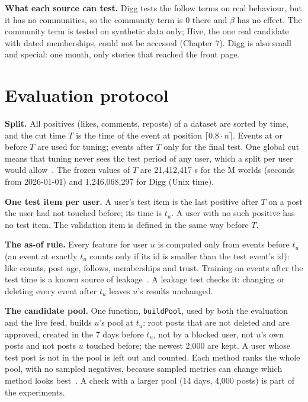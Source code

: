 \textbf{What each source can test.} Digg tests the follow terms on real behaviour, but it has no communities, so the community term is 0 there and $\beta$ has no effect. The community term is tested on synthetic data only; Hive, the one real candidate with dated memberships, could not be accessed (Chapter 7). Digg is also small and special: one month, only stories that reached the front page.

\section{Evaluation protocol}
\label{sec:method-protocol}

\textbf{Split.} All positives (likes, comments, reposts) of a dataset are sorted by time, and the cut time $T$ is the time of the event at position $\lceil 0.8 \cdot n \rceil$. Events at or before $T$ are used for tuning; events after $T$ only for the final test. One global cut means that tuning never sees the test period of any user, which a split per user would allow~. The frozen values of $T$ are 21,412,417 s for the M worlds (seconds from 2026-01-01) and 1,246,068,297 for Digg (Unix time).

\textbf{One test item per user.} A user's test item is the last positive after $T$ on a post the user had not touched before; its time is $t_u$. A user with no such positive has no test item. The validation item is defined in the same way before $T$.

\textbf{The as-of rule.} Every feature for user $u$ is computed only from events before $t_u$ (an event at exactly $t_u$ counts only if its id is smaller than the test event's id): like counts, post age, follows, memberships and trust. Training on events after the test time is a known source of leakage~. A leakage test checks it: changing or deleting every event after $t_u$ leaves $u$'s results unchanged.

\textbf{The candidate pool.} One function, \texttt{buildPool}, used by both the evaluation and the live feed, builds $u$'s pool at $t_u$: root posts that are not deleted and are approved, created in the 7 days before $t_u$, not by a blocked user, not $u$'s own posts and not posts $u$ touched before; the newest 2,000 are kept. A user whose test post is not in the pool is left out and counted. Each method ranks the whole pool, with no sampled negatives, because sampled metrics can change which method looks best~. A check with a larger pool (14 days, 4,000 posts) is part of the experiments.

